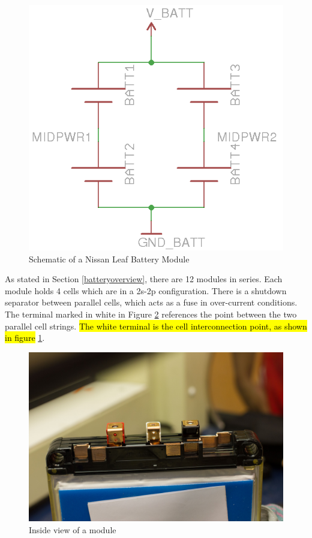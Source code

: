 \documentclass{article}
\DeclareRobustCommand{\hlr}[1]{{\sethlcolor{red}\hl{#1}}}
\begin{document}
            
            \begin{figure}[H]
            \centering
            \includegraphics{moduleschem}
            \caption{Schematic of a Nissan Leaf Battery Module}
            \label{module}
            \end{figure}
            
            As stated in Section \ref{batteryoverview}, there are 12 modules in series. Each module holds 4 cells which are in a 2s-2p configuration. There is a shutdown separator between parallel cells, which acts as a fuse in over-current conditions. The terminal marked in white in Figure \ref{canopener} references the point between the two parallel cell strings. \hlr{The white terminal is the cell interconnection point, as shown in figure} \ref{module}.
            
            \begin{figure}[H]
            \centering
            \includegraphics[width = 0.6 \textwidth]{OpenModule}
            \caption{Inside view of a module}
            \label{canopener}
            \end{figure}
            
\end{document}
